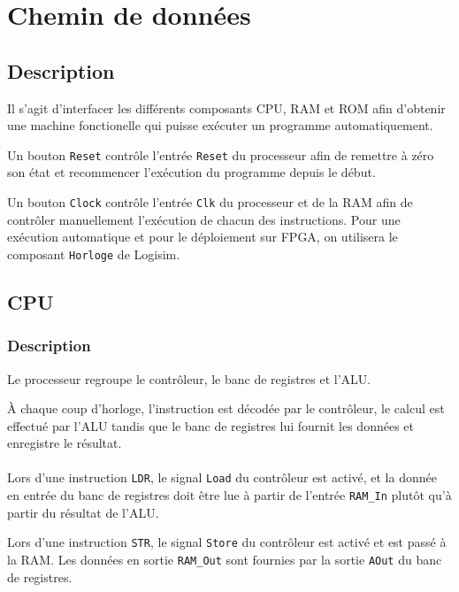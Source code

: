 \section{Chemin de données}

\subsection{Description}

Il s'agit d'interfacer les différents composants CPU, RAM et ROM afin d'obtenir une machine fonctionelle qui puisse exécuter un programme automatiquement.

Un bouton \texttt{Reset} contrôle l'entrée \texttt{Reset} du processeur afin de remettre à zéro son état et recommencer l'exécution du programme depuis le début.

Un bouton \texttt{Clock} contrôle l'entrée \texttt{Clk} du processeur et de la RAM afin de contrôler manuellement l'exécution de chacun des instructions. Pour une exécution automatique et pour le déploiement sur FPGA, on utilisera le composant \texttt{Horloge} de Logisim.


\subsection{CPU}

\subsubsection{Description}

Le processeur regroupe le contrôleur, le banc de registres et l'ALU.

À chaque coup d'horloge, l'instruction est décodée par le contrôleur, le calcul est effectué par l'ALU tandis que le banc de registres lui fournit les données et enregistre le résultat.

\paragraph{}
Lors d'une instruction \texttt{LDR}, le signal \texttt{Load} du contrôleur est activé, et la donnée en entrée du banc de registres doit être lue à partir de l'entrée \texttt{RAM\_In} plutôt qu'à partir du résultat de l'ALU.

Lors d'une instruction \texttt{STR}, le signal \texttt{Store} du contrôleur est activé et est passé à la RAM. Les données en sortie \texttt{RAM\_Out} sont fournies par la sortie \texttt{AOut} du banc de registres.

